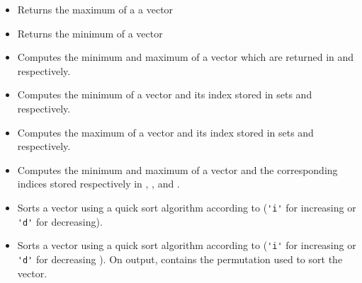 \begin{itemize}
\item {}
  \sshortdescribe Returns the maximum of a a vector  

\item {}
  \sshortdescribe Returns the minimum of a vector  

\item {}
  \sshortdescribe Computes the minimum and maximum of a vector which are
  returned in   and  respectively.
  
\item {}
  \sshortdescribe Computes the minimum of a vector and its index stored in 
  sets  and  respectively.

\item {}
  \sshortdescribe Computes the maximum of a vector and its index stored in 
  sets  and  respectively.

\item {}
  \sshortdescribe Computes the minimum and maximum of a vector and the
  corresponding indices stored respectively in , ,  and
  .

\item {}
  \sshortdescribe Sorts a vector using a quick sort algorithm according to
   (\verb!'i'! for increasing or \verb!'d'! for decreasing).

\item {}
  \sshortdescribe Sorts a vector using a quick sort algorithm according to
   (\verb!'i'! for increasing or \verb!'d'! for decreasing ). On
  output,  contains the permutation used to sort the vector.
\end{itemize}

